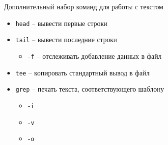\begin{frame}{Дополнительный набор команд для работы с текстом}
	\begin{itemize}
	  \item {\tt head} -- вывести первые строки
	  \item {\tt tail} -- вывести последние строки
		\begin{itemize}
			\item {\tt -f} -- отслеживать добавление данных в файл 
		\end{itemize}
	  \item {\tt tee} -- копировать стандартный вывод в файл
	  \item {\tt grep} -- печать текста, соответствующего шаблону
		\begin{itemize}
			\item {\tt -i}	
			\item {\tt -v}
			\item {\tt -o}
		\end{itemize}
	\end{itemize}
\end{frame}

